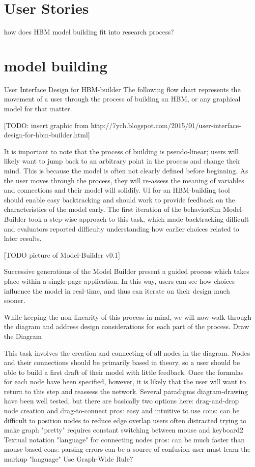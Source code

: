 \section{User Stories}
how does HBM model building fit into research process?

\section{model building}
User Interface Design for HBM-builder 
The following flow chart represents the movement of a user through the process of building an HBM, or any graphical model for that matter.

[TODO: insert graphic from http://7ych.blogspot.com/2015/01/user-interface-design-for-hbm-builder.html]

It is important to note that the process of building is pseudo-linear; users will likely want to jump back to an arbitrary point in the process and change their mind. This is because the model is often not clearly defined before beginning. As the user moves through the process, they will re-assess the meaning of variables and connections and their model will solidify. UI for an HBM-building tool should enable easy backtracking and should work to provide feedback on the characteristics of the model early. The first iteration of the behaviorSim Model-Builder took a step-wise approach to this task, which made backtracking difficult and evaluators reported difficulty understanding how earlier choices related to later results.

[TODO picture of Model-Builder v0.1] 

Successive generations of the Model Builder present a guided process which takes place within  a single-page application. In this way, users can see how choices influence the model in real-time, and thus can iterate on their design much sooner.

While keeping the non-linearity of this process in mind, we will now walk through the diagram and address design considerations for each part of the process.
Draw the Diagram

This task involves the creation and connecting of all nodes in the diagram. Nodes and their connections should be primarily based in theory, so a user should be able to build a first draft of their model with little feedback. Once the formulas for each node have been specified, however, it is likely that the user will want to return to this step and reassess the network. Several paradigms diagram-drawing have been well tested, but there are basically two options here:
drag-and-drop node creation and drag-to-connect
pros:
easy and intuitive to use
cons: 
can be difficult to position nodes to reduce edge overlap
users often distracted trying to make graph "pretty"
requires constant switching between mouse and keyboard2
Textual notation "language" for connecting nodes
pros:
can be much faster than mouse-based
cons:
parsing errors can be a source of confusion
user must learn the markup "language"
Use Graph-Wide Rule?

